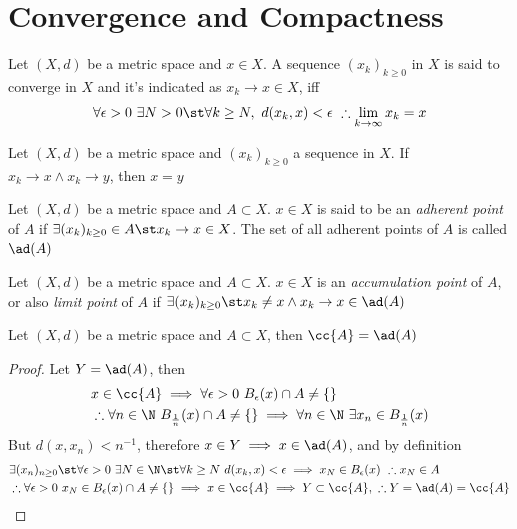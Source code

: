 \documentclass[../mmf.tex]{subfiles}
\begin{document}
\section{Convergence and Compactness}
\begin{dfn}[Convergence]
	Let $(X,d)$ be a metric space and $x\in X$. A sequence $(x_k)_{k\ge0}$ in $X$ is said to converge in $X$ and it's indicated as $x_k\to x\in X$, iff
	\begin{equation*}
		\forall\epsilon>0\ \exists N>0\st\forall k\ge N,\ d(x_k,x)<\epsilon\ \therefore\lim_{k\to\infty}x_k=x
	\end{equation*}
\end{dfn}
\begin{thm}
	Let $(X,d)$ be a metric space and $(x_k)_{k\ge0}$ a sequence in $X$. If $x_k\to x\wedge x_k\to y$, then $x=y$
\end{thm}
\begin{dfn}
	Let $(X,d)$ be a metric space and $A\subset X$. $x\in X$ is said to be an \textit{adherent point} of $A$ if $\exists(x_k)_{k\ge0}\in A\st x_k\to x\in X$. The set of all adherent points of $A$ is called $\ad(A)$
\end{dfn}
\begin{dfn}
	Let $(X,d)$ be a metric space and $A\subset X$. $x\in X$ is an \textit{accumulation point} of $A$, or also \textit{limit point} of $A$ if $\exists(x_k)_{k\ge0}\st x_k\ne x\wedge x_k\to x\in\ad(A)$
\end{dfn}
\begin{prop}
	Let $(X,d)$ be a metric space and $A\subset X$, then $\cc{A}=\ad(A)$
\end{prop}
\begin{proof}
	Let $Y=\ad(A)$, then
	\begin{equation*}
		\begin{aligned}
			&x\in\cc{A}\implies{}\forall\epsilon>0\ B_\epsilon(x)\cap A\ne\{\}\\
			&\therefore\forall n\in\N\ B_{\frac{1}{n}}(x)\cap A\ne\{\}\implies{}\forall n\in\N\ \exists x_n\in B_{\frac{1}{n}}(x)
		\end{aligned}
	\end{equation*}
	But $d(x,x_n)<n^{-1}$, therefore $x\in Y\implies{} x\in\ad(A)$, and by definition
	\begin{equation*}
		\begin{aligned}
			&\exists(x_n)_{n\ge0}\st\forall\epsilon>0\ \exists N\in\N\st\forall k\ge N\ d(x_k,x)<\epsilon\implies{} x_N\in B_\epsilon(x)\ \therefore x_N\in A\\
			&\therefore\forall\epsilon>0\ x_N\in B_\epsilon(x)\cap A\ne\{\}\implies{} x\in\cc{A}\implies{} Y\subset\cc{A},\ \therefore Y=\ad(A)=\cc{A}
		\end{aligned}
	\end{equation*}
\end{proof}
\end{document}
